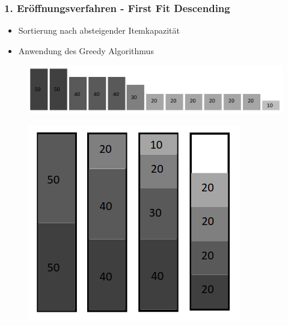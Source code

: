 \documentclass{beamer}
\begin{document}
\begin{frame}
\frametitle{1. Eröffnungsverfahren - First Fit Descending}
\begin{itemize}
\item Sortierung nach absteigender Itemkapazität
\item Anwendung des Greedy Algorithmus
\end{itemize}
\begin{figure}[!htbp]
\begin{center}
\includegraphics[scale=0.25]{img/FFD_items.png}
\end{center}
\end{figure}

\begin{figure}
\begin{center}
\includegraphics[scale=0.25]{img/Greedy.png}
\end{center}
\end{figure}




\end{frame}
\end{document}
